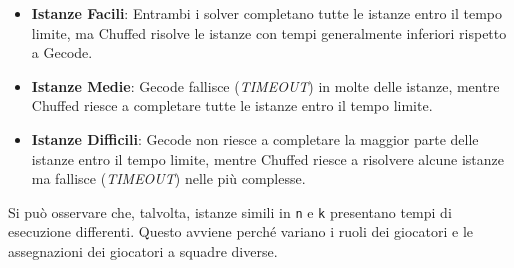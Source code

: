 \documentclass{article}
\begin{document}
\begin{multicols*}{2}
\begin{itemize}
    \item \textbf{Istanze Facili}: Entrambi i solver completano tutte le istanze entro il tempo limite, ma Chuffed risolve le istanze con tempi generalmente inferiori rispetto a Gecode.
    \item \textbf{Istanze Medie}: Gecode fallisce (\textit{TIMEOUT}) in molte delle istanze, mentre Chuffed riesce a completare tutte le istanze entro il tempo limite.
    \item \textbf{Istanze Difficili}: Gecode non riesce a completare la maggior parte delle istanze entro il tempo limite, mentre Chuffed riesce a risolvere alcune istanze ma fallisce (\textit{TIMEOUT}) nelle più complesse.
\end{itemize}
Si può osservare che, talvolta, istanze simili in \texttt{n} e \texttt{k} presentano tempi di esecuzione differenti. Questo avviene perché variano i ruoli dei giocatori e le assegnazioni dei giocatori a squadre diverse.



\end{multicols*}
\end{document}
